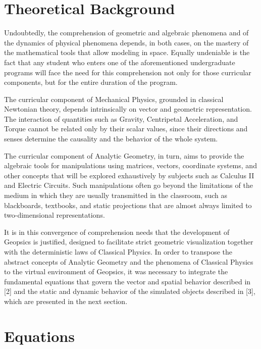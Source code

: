 \documentclass[conference,a4paper]{IEEEtran}
\begin{document}
\section{Theoretical Background}

Undoubtedly, the comprehension of geometric and algebraic phenomena and of the dynamics of physical phenomena depends, in both cases, on the mastery of the mathematical tools that allow modeling in space. Equally undeniable is the fact that any student who enters one of the aforementioned undergraduate programs will face the need for this comprehension not only for those curricular components, but for the entire duration of the program.

The curricular component of Mechanical Physics, grounded in classical Newtonian theory, depends intrinsically on vector and geometric representation. The interaction of quantities such as Gravity, Centripetal Acceleration, and Torque cannot be related only by their scalar values, since their directions and senses determine the causality and the behavior of the whole system.

The curricular component of Analytic Geometry, in turn, aims to provide the algebraic tools for manipulations using matrices, vectors, coordinate systems, and other concepts that will be explored exhaustively by subjects such as Calculus II and Electric Circuits. Such manipulations often go beyond the limitations of the medium in which they are usually transmitted in the classroom, such as blackboards, textbooks, and static projections that are almost always limited to two-dimensional representations.

It is in this convergence of comprehension needs that the development of Geopsics is justified, designed to facilitate strict geometric visualization together with the deterministic laws of Classical Physics. In order to transpose the abstract concepts of Analytic Geometry and the phenomena of Classical Physics to the virtual environment of Geopsics, it was necessary to integrate the fundamental equations that govern the vector and spatial behavior described in [2] and the static and dynamic behavior of the simulated objects described in [3], which are presented in the next section.

\section{Equations}
\end{document}
